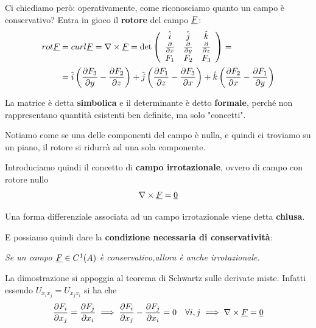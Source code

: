 \bigskip

Ci chiediamo però: operativamente, come riconosciamo quanto un campo è conservativo? Entra in gioco il \textbf{rotore} del campo $\underline{F}$:
\begin{align}
	rot \underline{F} {}&= curl \underline{F} = \nabla \times \underline{F} = \det \left( \begin{array}{ccc} \hat{i} & \hat{j} & \hat{k}\\ \frac{\partial }{\partial x} & \frac{\partial }{\partial y} & \frac{\partial }{\partial z}\\ F_1 & F_2 & F_3 \end{array} \right)= \nonumber \\
	&= \hat{i} \left( \frac{\partial F_3}{\partial y} - \frac{\partial F_2}{\partial z} \right)  + \hat{j}  \left( \frac{\partial F_1}{\partial z} - \frac{\partial F_3}{\partial x} \right) + \hat{k} \left( \frac{\partial F_2}{\partial x} - \frac{\partial F_1}{\partial y} \right)
\end{align}

La matrice è detta \textbf{simbolica} e il determinante è detto \textbf{formale}, perché non rappresentano quantità esistenti ben definite, ma solo "concetti".



Notiamo come se una delle componenti del campo è nulla, e quindi ci troviamo su un piano, il rotore si ridurrà ad una sola componente.

\bigskip

Introduciamo quindi il concetto di \textbf{campo irrotazionale}, ovvero di campo con rotore nullo
\begin{align}
	\nabla \times \underline{F} = \underline{0}
\end{align}

Una forma differenziale associata ad un campo irrotazionale viene detta \textbf{chiusa}.

E possiamo quindi dare la \textbf{condizione necessaria di conservatività}:

\bigskip

\textit{Se un campo $\underline{F}\in C^1(A)$ è conservativo,allora è anche irrotazionale.}

\bigskip

La dimostrazione si appoggia al teorema di Schwartz sulle derivate miste. Infatti essendo $U_{x_i x_j}=U_{x_j x_i}$ si ha che
\begin{align}
	\frac{\partial F_i}{\partial x_j} = \frac{\partial F_j}{\partial x_i} \implies \frac{\partial F_i}{\partial x_j} - \frac{\partial F_j}{\partial x_i} =0 \quad \forall i,j \implies \nabla \times \underline{F}=\underline{0}
\end{align}

